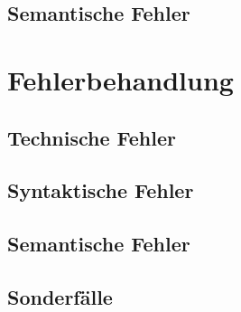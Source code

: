 \subsection{Semantische Fehler}\label{subsec:semantische-fehler}


\section{Fehlerbehandlung}\label{sec:fehlerbehandlung}

\subsection{Technische Fehler}\label{subsec:technische-fehler-behandlung}

\subsection{Syntaktische Fehler}\label{subsec:syntaktische-fehler-behandlung}

\subsection{Semantische Fehler}\label{subsec:semantische-fehler-behandlung}
\subsection{Sonderfälle}\label{subsec:sonderfaelle}
